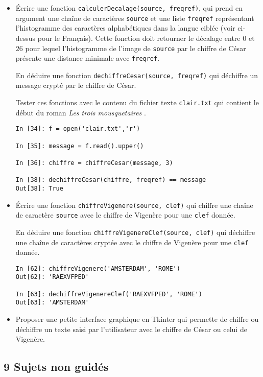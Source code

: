 \documentclass[a4paper, french, 12pt]{article}  %
\newcounter{act}
\begin{document}
\begin{itemize}[label=]
\item Écrire une fonction \texttt{calculerDecalage(source, freqref)}, qui prend en argument une chaîne de caractères \texttt{source}  et une liste \texttt{freqref} représentant l'histogramme des caractères alphabétiques  dans la langue ciblée (voir ci-dessus pour le Français). Cette fonction doit retourner le décalage entre $0$ et $26$ pour lequel l'histogramme de l'image de \texttt{source} par le chiffre de César présente une distance minimale avec \texttt{freqref}.

En déduire une fonction \texttt{dechiffreCesar(source, freqref)} qui déchiffre un message crypté par le chiffre de César.


Tester ces fonctions avec le contenu du fichier texte \texttt{clair.txt} qui contient le début du roman \og{} \textit{Les trois mousquetaires} \fg{}.

\begin{lstlisting}
In [34]: f = open('clair.txt','r')

In [35]: message = f.read().upper()

In [36]: chiffre = chiffreCesar(message, 3)

In [38]: dechiffreCesar(chiffre, freqref) == message
Out[38]: True
\end{lstlisting}

\item Écrire une fonction \texttt{chiffreVigenere(source, clef)} qui chiffre  une chaîne de caractère \texttt{source} avec le chiffre de Vigenère pour une \texttt{clef} donnée.

En déduire une fonction \texttt{chiffreVigenereClef(source, clef)} qui déchiffre une chaîne de caractères cryptée avec le chiffre de Vigenère pour une \texttt{clef} donnée.

\begin{lstlisting}
In [62]: chiffreVigenere('AMSTERDAM', 'ROME')
Out[62]: 'RAEXVFPED'

In [63]: dechiffreVigenereClef('RAEXVFPED', 'ROME')
Out[63]: 'AMSTERDAM'
\end{lstlisting}


\item Proposer une petite interface graphique en Tkinter qui permette de chiffre ou déchiffre un texte saisi par l'utilisateur  avec le chiffre de César ou celui de Vigenère.

\end{itemize}


\subsection{9 Sujets non guidés}
\end{document}
